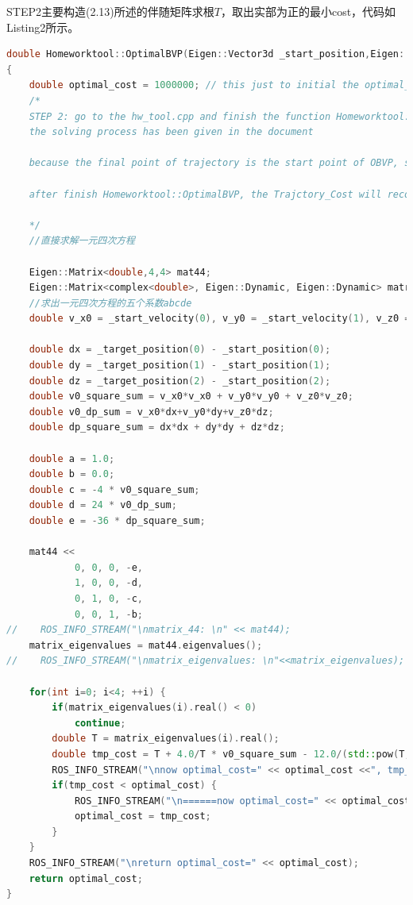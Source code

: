 \documentclass[40pt,a4paper,UTF8]{ctexart}
\numberwithin{equation}{section}
\begin{document}
STEP2主要构造(2.13)所述的伴随矩阵求根$T$，取出实部为正的最小cost，代码如Listing2所示。
\begin{lstlisting}[language=C++, caption=hw\_tool.cpp/OptimalBVP()]
double Homeworktool::OptimalBVP(Eigen::Vector3d _start_position,Eigen::Vector3d _start_velocity,Eigen::Vector3d _target_position)
{
    double optimal_cost = 1000000; // this just to initial the optimal_cost, you can delete it
    /*
    STEP 2: go to the hw_tool.cpp and finish the function Homeworktool::OptimalBVP
    the solving process has been given in the document

    because the final point of trajectory is the start point of OBVP, so we input the pos,vel to the OBVP

    after finish Homeworktool::OptimalBVP, the Trajctory_Cost will record the optimal cost of this trajectory

    */
    //直接求解一元四次方程

    Eigen::Matrix<double,4,4> mat44;
    Eigen::Matrix<complex<double>, Eigen::Dynamic, Eigen::Dynamic> matrix_eigenvalues;
    //求出一元四次方程的五个系数abcde
    double v_x0 = _start_velocity(0), v_y0 = _start_velocity(1), v_z0 = _start_velocity(2);

    double dx = _target_position(0) - _start_position(0);
    double dy = _target_position(1) - _start_position(1);
    double dz = _target_position(2) - _start_position(2);
    double v0_square_sum = v_x0*v_x0 + v_y0*v_y0 + v_z0*v_z0;
    double v0_dp_sum = v_x0*dx+v_y0*dy+v_z0*dz;
    double dp_square_sum = dx*dx + dy*dy + dz*dz;

    double a = 1.0;
    double b = 0.0;
    double c = -4 * v0_square_sum;
    double d = 24 * v0_dp_sum;
    double e = -36 * dp_square_sum;

    mat44 <<
            0, 0, 0, -e,
            1, 0, 0, -d,
            0, 1, 0, -c,
            0, 0, 1, -b;
//    ROS_INFO_STREAM("\nmatrix_44: \n" << mat44);
    matrix_eigenvalues = mat44.eigenvalues();
//    ROS_INFO_STREAM("\nmatrix_eigenvalues: \n"<<matrix_eigenvalues);

    for(int i=0; i<4; ++i) {
        if(matrix_eigenvalues(i).real() < 0)
            continue;
        double T = matrix_eigenvalues(i).real();
        double tmp_cost = T + 4.0/T * v0_square_sum - 12.0/(std::pow(T,2)) * v0_dp_sum + 12.0/std::pow(T,3) * dp_square_sum;
        ROS_INFO_STREAM("\nnow optimal_cost=" << optimal_cost <<", tmp_cost= " << tmp_cost);
        if(tmp_cost < optimal_cost) {
            ROS_INFO_STREAM("\n======now optimal_cost=" << optimal_cost <<", found lower cost= " << tmp_cost);
            optimal_cost = tmp_cost;
        }
    }
    ROS_INFO_STREAM("\nreturn optimal_cost=" << optimal_cost);
    return optimal_cost;
}
\end{lstlisting}
\end{document}
